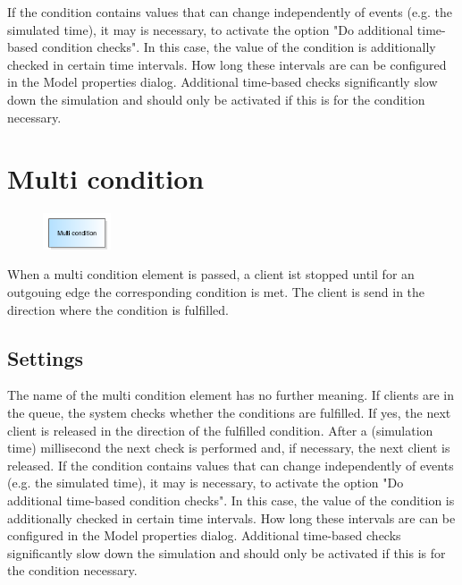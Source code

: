 If the condition contains values that can change independently of events (e.g. the simulated time),
it may is necessary, to activate the option "Do additional time-based condition checks". In this case,
the value of the condition is additionally checked in certain time intervals. How long these intervals
are can be configured in the Model properties dialog.
Additional time-based checks significantly slow down the simulation and should only be activated
if this is for the condition necessary.


\section{Multi condition}
\label{ref:ModelElementHoldMulti}

\begin{figure}
\vspace{-22pt}
\includegraphics[width=2cm]{imageModelElementHoldMulti.png}
\vspace{-22pt}
\end{figure}

When a multi condition element is passed, a client ist stopped until for an outgouing edge the
corresponding condition is met. The client is send in the direction where the condition is fulfilled.

\subsection*{Settings}

The name of the multi condition element has no further meaning.
If clients are in the queue, the system checks whether the conditions are fulfilled.
If yes, the next client is released in the direction of the fulfilled condition. After a (simulation time) millisecond the next check
is performed and, if necessary, the next client is released.
If the condition contains values that can change independently of events (e.g. the simulated time),
it may is necessary, to activate the option "Do additional time-based condition checks". In this case,
the value of the condition is additionally checked in certain time intervals. How long these intervals
are can be configured in the Model properties dialog.
Additional time-based checks significantly slow down the simulation and should only be activated
if this is for the condition necessary.


